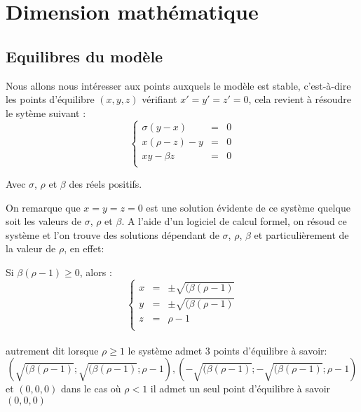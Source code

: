 \section{Dimension mathématique}

\subsection{Equilibres du modèle}
Nous allons nous intéresser aux points auxquels le modèle est stable, c’est-à-dire les points d’équilibre $(x,y,z)$ vérifiant $x'=y'=z'=0$, cela revient à résoudre le sytème suivant :
\[
    \left\{
    \begin{array}{rcl}
        \sigma(y-x)&=&0\\
        x(\rho-z)-y&=&0\\
        xy-\beta z&=&0\\
    \end{array}
    \right.
\]

Avec $\sigma$, $\rho$ et $\beta$ des réels positifs.

On remarque que $x=y=z=0$ est une solution évidente de ce système quelque soit les valeurs de $\sigma$, $\rho$ et $\beta$. A l'aide d'un logiciel de calcul formel, on résoud ce système et l'on trouve des solutions dépendant de $\sigma$, $\rho$, $\beta$ et particulièrement de la valeur de $\rho$, en effet:

Si $\beta(\rho-1)\geq 0$, alors :
\[
    \left\{
    \begin{array}{rcl}
        x&=& \pm \sqrt{(\beta(\rho-1)}\\
        y&=& \pm \sqrt{(\beta(\rho-1)}\\
        z&=&\rho-1\\
    \end{array}
    \right.
\]\\
autrement dit lorsque $\rho\geq 1$ le système admet 3 points d'équilibre à savoir:
$$(\sqrt{(\beta(\rho-1)}; \sqrt{(\beta(\rho-1)}; \rho-1), (-\sqrt{(\beta(\rho-1)}; -\sqrt{(\beta(\rho-1)}; \rho-1)$$
et $(0,0,0)$ dans le cas où $\rho < 1$ il admet un seul point d'équilibre à savoir $(0,0,0)$
 
